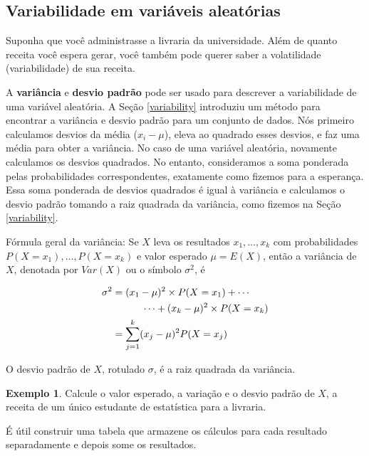 \documentclass[
]{book}
\theoremstyle{definition}
\theoremstyle{definition}
\newtheorem{example}{Exemplo}[chapter]
\theoremstyle{definition}
\theoremstyle{definition}
\theoremstyle{remark}
\begin{document}
\hypertarget{variabilityRandomVariables}{%
\subsection{Variabilidade em variáveis aleatórias}\label{variabilityRandomVariables}}

Suponha que você administrasse a livraria da universidade. Além de quanto receita você espera gerar, você também pode querer saber a volatilidade (variabilidade) de sua receita.

A \textbf{variância} e \textbf{desvio padrão} pode ser usado para descrever a variabilidade de uma variável aleatória. A Seção \ref{variability} introduziu um método para encontrar a variância e desvio padrão para um conjunto de dados. Nós primeiro calculamos desvios da média (\(x_i - \mu\)), eleva ao quadrado esses desvios, e faz uma média para obter a variância. No caso de uma variável aleatória, novamente calculamos os desvios quadrados. No entanto, consideramos a soma ponderada pelas probabilidades correspondentes, exatamente como fizemos para a esperança. Essa soma ponderada de desvios quadrados é igual à variância e calculamos o desvio padrão tomando a raiz quadrada da variância, como fizemos na Seção \ref{variability}.

Fórmula geral da variância: Se \(X\) leva os resultados \(x_1, \dots, x_k\) com probabilidades \(P(X=x_1), \dots, P(X=x_k)\) e valor esperado \(\mu=E(X)\), então a variância de \(X\), denotada por \(Var(X)\) ou o símbolo \(\sigma^2\), é

\begin{align}
\sigma^2 &= (x_1-\mu)^2\times P(X=x_1) + \cdots \notag \\
    & \qquad\quad\cdots+ (x_k-\mu)^2\times P(X=x_k) \notag \\
    &= \sum_{j=1}^{k} (x_j - \mu)^2 P(X=x_j)
\end{align}

O desvio padrão de \(X\), rotulado \(\sigma\), é a raiz quadrada da variância.

\begin{example}
\protect\hypertarget{exm:unnamed-chunk-72}{}{\label{exm:unnamed-chunk-72} }Calcule o valor esperado, a variação e o desvio padrão de \(X\), a receita de um único estudante de estatística para a livraria.
\end{example}

É útil construir uma tabela que armazene os cálculos para cada resultado separadamente e depois some os resultados.
\end{document}
